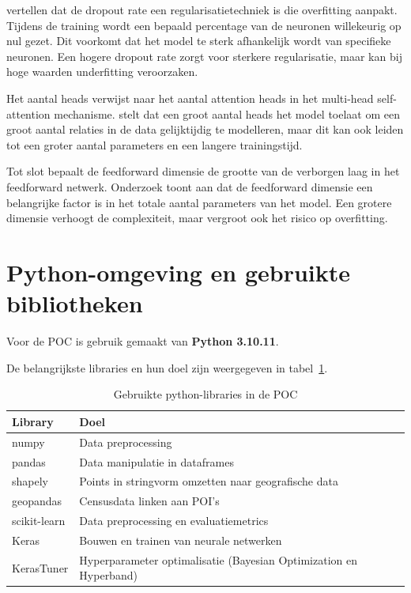 \textcite{Salehin2023} vertellen dat de dropout rate een regularisatietechniek is die overfitting aanpakt. Tijdens de training wordt een bepaald percentage van de neuronen willekeurig op nul gezet. Dit voorkomt dat het model te sterk afhankelijk wordt van specifieke neuronen. Een hogere dropout rate zorgt voor sterkere regularisatie, maar kan bij hoge waarden underfitting veroorzaken.

Het aantal heads verwijst naar het aantal attention heads in het multi-head self-attention mechanisme. \textcite{Cordonnier2020} stelt dat een groot aantal heads het model toelaat om een groot aantal relaties in de data gelijktijdig te modelleren, maar dit kan ook leiden tot een groter aantal parameters en een langere trainingstijd.

Tot slot bepaalt de feedforward dimensie de grootte van de verborgen laag in het feedforward netwerk. Onderzoek \autocite{Pires2023} toont aan dat de feedforward dimensie een belangrijke factor is in het totale aantal parameters van het model. Een grotere dimensie verhoogt de complexiteit, maar vergroot ook het risico op overfitting.

\section{Python-omgeving en gebruikte bibliotheken}

Voor de POC is gebruik gemaakt van \textbf{Python 3.10.11}. 

De belangrijkste libraries en hun doel zijn weergegeven in tabel~\ref{tab:python-libraries}.

\begin{table}[H]
    \centering
    \caption{Gebruikte python-libraries in de POC}
    \label{tab:python-libraries}
    \begin{tabular}{ll}
        \toprule
        \textbf{Library} & \textbf{Doel} \\
        \midrule
        numpy & Data preprocessing \\
        pandas & Data manipulatie in dataframes \\
        shapely & Points in stringvorm omzetten naar geografische data \\
        geopandas & Censusdata linken aan POI's \\
        scikit-learn & Data preprocessing en evaluatiemetrics \\
        Keras & Bouwen en trainen van neurale netwerken \\
        KerasTuner & Hyperparameter optimalisatie (Bayesian Optimization en Hyperband) \\
        \bottomrule
    \end{tabular}
\end{table}


